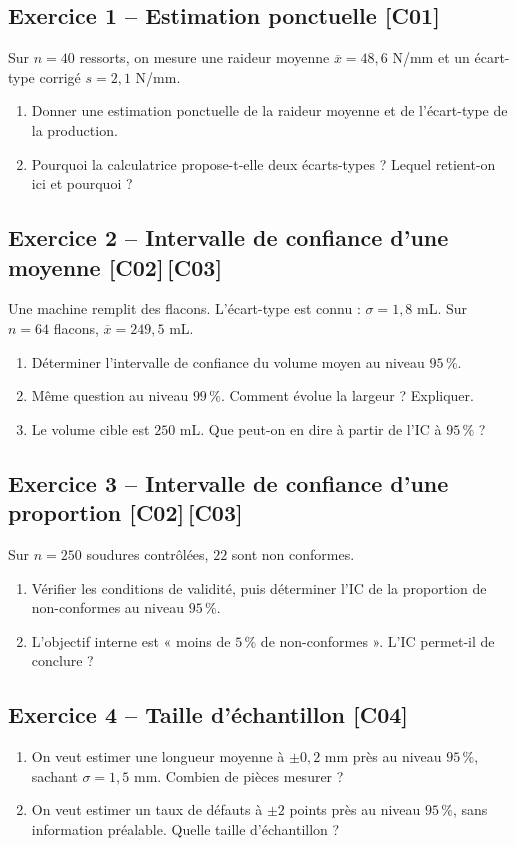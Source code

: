 \documentclass[a4paper,11pt]{article}
\begin{document}
\subsection*{Exercice 1 -- Estimation ponctuelle \hfill {\normalsize\color{uimmred}[C01]}}
Sur $n = 40$ ressorts, on mesure une raideur moyenne $\overline{x} = 48{,}6$ N/mm et un écart-type corrigé $s = 2{,}1$ N/mm.
\begin{enumerate}[label=\alph*)]
  \item Donner une estimation ponctuelle de la raideur moyenne et de l'écart-type de la production.
  \item Pourquoi la calculatrice propose-t-elle deux écarts-types ? Lequel retient-on ici et pourquoi ?
\end{enumerate}

\subsection*{Exercice 2 -- Intervalle de confiance d'une moyenne \hfill {\normalsize\color{uimmred}[C02]\,[C03]}}
Une machine remplit des flacons. L'écart-type est connu : $\sigma = 1{,}8$ mL. Sur $n = 64$ flacons, $\overline{x} = 249{,}5$ mL.
\begin{enumerate}[label=\alph*)]
  \item Déterminer l'intervalle de confiance du volume moyen au niveau $95\,\%$.
  \item Même question au niveau $99\,\%$. Comment évolue la largeur ? Expliquer.
  \item Le volume cible est $250$ mL. Que peut-on en dire à partir de l'IC à $95\,\%$ ?
\end{enumerate}

\subsection*{Exercice 3 -- Intervalle de confiance d'une proportion \hfill {\normalsize\color{uimmred}[C02]\,[C03]}}
Sur $n = 250$ soudures contrôlées, $22$ sont non conformes.
\begin{enumerate}[label=\alph*)]
  \item Vérifier les conditions de validité, puis déterminer l'IC de la proportion de non-conformes au niveau $95\,\%$.
  \item L'objectif interne est « moins de $5\,\%$ de non-conformes ». L'IC permet-il de conclure ?
\end{enumerate}

\subsection*{Exercice 4 -- Taille d'échantillon \hfill {\normalsize\color{uimmred}[C04]}}
\begin{enumerate}[label=\alph*)]
  \item On veut estimer une longueur moyenne à $\pm 0{,}2$ mm près au niveau $95\,\%$, sachant $\sigma = 1{,}5$ mm. Combien de pièces mesurer ?
  \item On veut estimer un taux de défauts à $\pm 2$ points près au niveau $95\,\%$, sans information préalable. Quelle taille d'échantillon ?
\end{enumerate}
\end{document}
